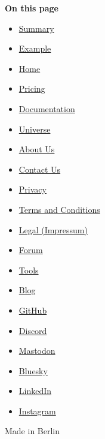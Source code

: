 \textbf{On this page}

\begin{itemize}
\tightlist
\item
  \hyperref[summary]{Summary}
\item
  \hyperref[example]{Example}
\end{itemize}

\begin{itemize}
\tightlist
\item
  \href{/}{Home}
\item
  \href{/pricing/}{Pricing}
\item
  \href{/docs/}{Documentation}
\item
  \href{/universe/}{Universe}
\item
  \href{/about/}{About Us}
\item
  \href{/contact/}{Contact Us}
\item
  \href{/privacy/}{Privacy}
\item
  \href{https://typst.app/terms}{Terms and Conditions}
\item
  \href{/legal/}{Legal (Impressum)}
\end{itemize}

\begin{itemize}
\tightlist
\item
  \href{https://forum.typst.app}{Forum}
\item
  \href{/tools/}{Tools}
\item
  \href{/blog/}{Blog}
\item
  \href{https://github.com/typst/}{GitHub}
\item
  \href{https://discord.gg/2uDybryKPe}{Discord}
\item
  \href{https://mastodon.social/@typst}{Mastodon}
\item
  \href{https://bsky.app/profile/typst.app}{Bluesky}
\item
  \href{https://www.linkedin.com/company/typst/}{LinkedIn}
\item
  \href{https://instagram.com/typstapp/}{Instagram}
\end{itemize}

Made in Berlin

